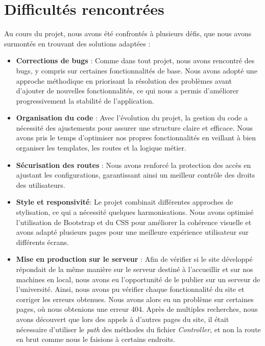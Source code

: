 \documentclass[12pt]{article}
\begin{document}
\section{Difficultés rencontrées}

    Au cours du projet, nous avons été confrontés à plusieurs défis, que nous avons surmontés en trouvant des solutions adaptées :
    \begin{itemize}
        \item \textbf{Corrections de bugs} : Comme dans tout projet, nous avons rencontré des bugs, y compris sur certaines fonctionnalités de base. Nous avons adopté une approche méthodique en priorisant la résolution des problèmes avant d’ajouter de nouvelles fonctionnalités, ce qui nous a permis d’améliorer progressivement la stabilité de l’application.
        \item \textbf{Organisation du code} : Avec l'évolution du projet, la gestion du code a nécessité des ajustements pour assurer une structure claire et efficace. Nous avons pris le temps d’optimiser nos propres fonctionnalités en veillant à bien organiser les templates, les routes et la logique métier.
        \item \textbf{Sécurisation des routes} : Nous avons renforcé la protection des accès en ajustant les configurations, garantissant ainsi un meilleur contrôle des droits des utilisateurs.
        \item \textbf{Style et responsivité}: Le projet combinait différentes approches de stylisation, ce qui a nécessité quelques harmonisations. Nous avons optimisé l'utilisation de Bootstrap et du CSS pour améliorer la cohérence visuelle et avons adapté plusieurs pages pour une meilleure expérience utilisateur sur différents écrans.
        \item \textbf{Mise en production sur le serveur} : Afin de vérifier si le site développé répondait de la même manière sur le serveur destiné à l'accueillir et sur nos machines en local, nous avons eu l'opportunité de le publier sur un serveur de l'université.
        Ainsi, nous avons pu vérifier chaque fonctionnalité du site et corriger les erreurs obtenues. Nous avons alors eu un problème sur certaines pages, où nous obtenions une erreur 404.
        Après de multiples recherches, nous avons découvert que lors des appels à d'autres pages du site, il était nécessaire d'utiliser le \textit{path} des méthodes du fichier \textit{Controller}, et non la route en brut comme nous le faisions à certains endroits.
    \end{itemize}
\end{document}
